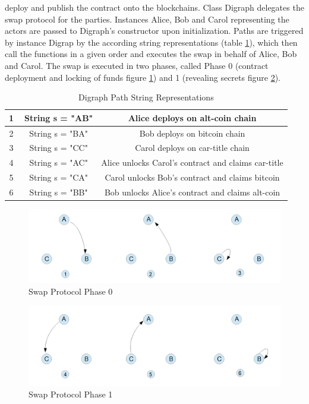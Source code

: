 deploy and publish the contract onto the blockchains. Class Digraph delegates the swap protocol for the parties. Instances Alice, Bob and Carol representing the actors are passed to Digraph's constructor upon initialization. Paths are triggered by instance Digrap by the according string representations (table \ref{table:2}), which then call the functions in a given order and executes the swap in behalf of Alice, Bob and Carol. The swap is executed in two phases, called Phase 0 (contract deployment and locking of funds figure \ref{fig:phase0}) and 1 (revealing secrets figure \ref{fig:phase1}). \newline

\begin{table}[h!]
	\centering
	\begin{tabular}{|c | c | c |} 
		\hline 
		\textcircled{1} & String s = "AB" & Alice deploys on alt-coin chain\\ [0.5ex] 
		\hline
		\textcircled{2} & String s = "BA" & Bob deploys on bitcoin chain\\ 
		\hline
		\textcircled{3} & String s = "CC" & Carol deploys on car-title chain \\
		\hline
		\textcircled{4} & String s = "AC" & Alice unlocks Carol's contract and claims car-title \\ [1ex] 
		\hline
		\textcircled{5} & String s = "CA" & Carol unlocks Bob's contract and claims bitcoin \\ [1ex] 
		\hline
		\textcircled{6} & String s = "BB" & Bob unlocks Alice's contract and claims alt-coin \\ [1ex] 
		\hline
	\end{tabular}
	\caption{Digraph Path String Representations}
	\label{table:2}
\end{table}

\begin{figure}[h]
	\includegraphics[width=0.7\paperwidth]{phase0}	
	\caption{Swap Protocol Phase 0}
	\label{fig:phase0}
\end{figure}

\begin{figure}[h]
	\includegraphics[width=0.7\paperwidth]{phase1}
	\caption{Swap Protocol Phase 1}
	\label{fig:phase1}
\end{figure}


